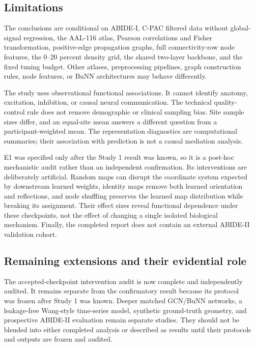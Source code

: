 \documentclass[11pt,a4paper]{article}
\begin{document}
\subsection{Limitations}

The conclusions are conditional on ABIDE-I, C-PAC filtered data without
global-signal regression, the AAL-116 atlas, Pearson correlations and Fisher
transformation, positive-edge propagation graphs, full connectivity-row node
features, the 0--20 percent density grid, the shared two-layer backbone, and
the fixed tuning budget. Other atlases, preprocessing pipelines, graph
construction rules, node features, or BuNN architectures may behave
differently.

The study uses observational functional associations. It cannot identify
anatomy, excitation, inhibition, or causal neural communication. The technical
quality-control rule does not remove demographic or clinical sampling bias.
Site sample sizes differ, and an equal-site mean answers a different question
from a participant-weighted mean. The representation diagnostics are
computational summaries; their association with prediction is not a causal
mediation analysis.

E1 was specified only after the Study 1 result was known, so it is a post-hoc
mechanistic audit rather than an independent confirmation. Its interventions
are deliberately artificial. Random maps can disrupt the coordinate system
expected by downstream learned weights, identity maps remove both learned
orientation and reflections, and node shuffling preserves the learned map
distribution while breaking its assignment. Their effect sizes reveal
functional dependence under these checkpoints, not the effect of changing a
single isolated biological mechanism. Finally, the completed report does not
contain an external ABIDE-II validation cohort.

\subsection{Remaining extensions and their evidential role}

The accepted-checkpoint intervention audit is now complete and independently
audited. It remains separate from the confirmatory result because its protocol
was frozen after Study 1 was known. Deeper matched GCN/BuNN networks, a
leakage-free Wang-style time-series model, synthetic ground-truth geometry,
and prospective ABIDE-II evaluation remain separate studies. They should not
be blended into either completed analysis or described as results until their
protocols and outputs are frozen and audited.
\end{document}
